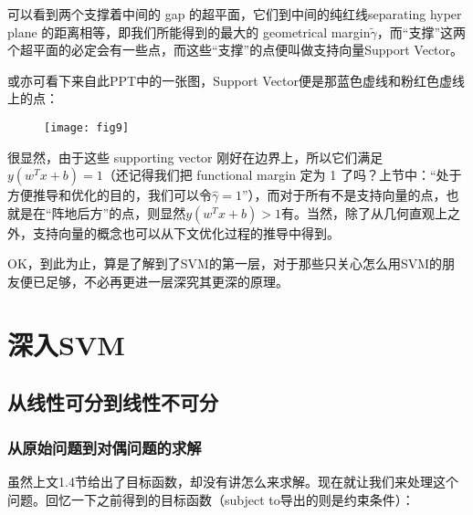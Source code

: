 \documentclass[a4paper,12pt]{article}
\begin{document}
可以看到两个支撑着中间的 gap 的超平面，它们到中间的纯红线separating hyper plane 的距离相等，即我们所能得到的最大的 geometrical margin$\widetilde{\gamma}$，而“支撑”这两个超平面的必定会有一些点，而这些“支撑”的点便叫做支持向量Support Vector。

或亦可看下来自此PPT中的一张图，Support Vector便是那蓝色虚线和粉红色虚线上的点：

\begin{figure}[H]
  \centering
  \texttt{[image: fig9]}
\end{figure}

很显然，由于这些 supporting vector 刚好在边界上，所以它们满足$y(w^Tx+b)=1$（还记得我们把 functional margin 定为 1 了吗？上节中：“处于方便推导和优化的目的，我们可以令$\widehat{\gamma}=1$”），而对于所有不是支持向量的点，也就是在“阵地后方”的点，则显然$y(w^Tx+b)>1$有。当然，除了从几何直观上之外，支持向量的概念也可以从下文优化过程的推导中得到。

OK，到此为止，算是了解到了SVM的第一层，对于那些只关心怎么用SVM的朋友便已足够，不必再更进一层深究其更深的原理。

\section{深入SVM}
\subsection{从线性可分到线性不可分}
\subsubsection{从原始问题到对偶问题的求解}
虽然上文1.4节给出了目标函数，却没有讲怎么来求解。现在就让我们来处理这个问题。回忆一下之前得到的目标函数（subject to导出的则是约束条件）：
\end{document}
